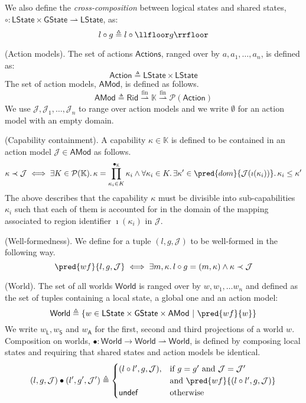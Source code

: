 We also define the \textit{cross-composition} between logical states and shared states, $\circ : \mathsf{LState} \times \mathsf{GState} \rightharpoonup \mathsf{LState}$, as:
\[
	l \circ g \triangleq l \circ \llfloor g \rrfloor
\]

 (Action models). The set of actions $\mathsf{Actions}$, ranged over by $a, a_1, \ldots, a_n$, is defined as:
\[
	\mathsf{Action} \triangleq \mathsf{LState} \times \mathsf{LState}
\]
The set of action models, $\mathsf{AMod}$, is defined as follows.
\[
	\mathsf{AMod} \triangleq \mathsf{Rid} \overset{\text{fin}}{\rightharpoonup} \mathbb{K} \overset{\text{fin}}{\rightharpoonup} \mathcal{P}(\mathsf{Action})
\]
We use $\mathcal{J}, \mathcal{J}_1, \ldots, \mathcal{J}_n$ to range over action models and we write $\emptyset$ for an action model with an empty domain.

 (Capability containment). A capability $\kappa \in \mathbb{K}$ is defined to be contained in an action model $\mathcal{J} \in \mathsf{AMod}$ as follows.
\[
	\kappa \prec \mathcal{J} \iff \exists K \in \mathcal{P}(\mathbb{K}) \ldotp \kappa = \prod_{\kappa_i \in K}^{\bullet_\mathbb{K}} \kappa_i \land \forall \kappa_i \in K \ldotp \exists \kappa' \in \pred{dom}{\mathcal{J}(\imath(\kappa_i))} \ldotp \kappa_i \leq \kappa'
\]
The above describes that the capability $\kappa$ must be divisible into sub-capabilities $\kappa_i$ such that each of them is accounted for in the domain of the mapping associated to region identifier $\imath(\kappa_i)$ in $\mathcal{J}$.

 (Well-formedness). We define for a tuple $(l, g, \mathcal{J})$ to be well-formed in the following way.
\[
	\pred{wf}{l, g, \mathcal{J}} \iff \exists m, \kappa \ldotp l \circ g = (m, \kappa) \land \kappa \prec \mathcal{J}
\]

 (World). The set of all worlds $\mathsf{World}$ is ranged over by $w, w_1, \ldots w_n$ and defined as the set of tuples containing a local state, a global one and an action model:
\[
	\mathsf{World} \triangleq \{ w \in \mathsf{LState} \times \mathsf{GState} \times \mathsf{AMod}\ |\ \pred{wf}{w} \}
\]
We write $w_\mathsf{L}, w_\mathsf{S}$ and $w_\mathsf{A}$ for the first, second and third projections of a world $w$. Composition on worlds, $\bullet : \mathsf{World} \rightarrow \mathsf{World} \rightharpoonup \mathsf{World}$, is defined by composing local states and requiring that shared states and action models be identical.
\[
	(l, g, \mathcal{J}) \bullet (l', g', \mathcal{J}') \triangleq
	\begin{cases}
		(l \circ l', g, \mathcal{J}), & \text{if } g = g' \text{ and } \mathcal{J} = \mathcal{J}' \\ & \text{and } \pred{wf}{(l \circ l', g, \mathcal{J})}
		\\
		\mathsf{undef} & \text{otherwise}
	\end{cases}
\]

